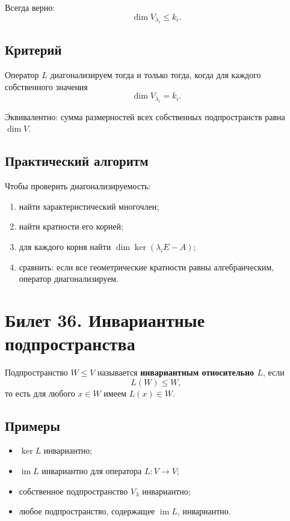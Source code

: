 \documentclass[12pt,a4paper]{article}
\DeclareMathOperator{\Ker}{ker}
\DeclareMathOperator{\Image}{im}
\begin{document}
Всегда верно:
\[
    \dim V_{\lambda_i}\le k_i.
\]

\subsection*{Критерий}

Оператор $L$ диагонализируем тогда и только тогда, когда для каждого собственного значения
\[
    \dim V_{\lambda_i}=k_i.
\]

Эквивалентно: сумма размерностей всех собственных подпространств равна $\dim V$.

\subsection*{Практический алгоритм}

Чтобы проверить диагонализируемость:
\begin{enumerate}
    \item найти характеристический многочлен;
    \item найти кратности его корней;
    \item для каждого корня найти $\dim\Ker(\lambda_iE-A)$;
    \item сравнить: если все геометрические кратности равны алгебраическим, оператор диагонализируем.
\end{enumerate}

\section{Билет 36. Инвариантные подпространства}

Подпространство $W\le V$ называется \textbf{инвариантным относительно $L$}, если
\[
    L(W)\le W,
\]
то есть для любого $x\in W$ имеем $L(x)\in W$.

\subsection*{Примеры}

\begin{itemize}
    \item $\Ker L$ инвариантно;
    \item $\Image L$ инвариантно для оператора $L:V\to V$;
    \item собственное подпространство $V_\lambda$ инвариантно;
    \item любое подпространство, содержащее $\Image L$, инвариантно.
\end{itemize}
\end{document}
